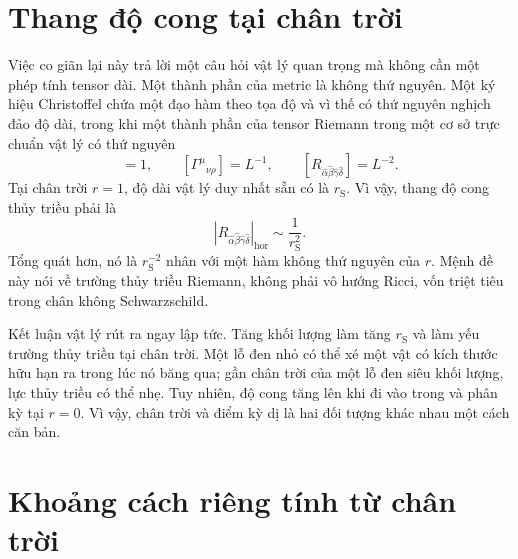 \begin{classroomqa}
\end{classroomqa}

\section{Thang độ cong tại chân trời}

Việc co giãn lại này trả lời một câu hỏi vật lý quan trọng mà không cần một phép tính tensor dài. Một thành phần của metric là không thứ nguyên. Một ký hiệu Christoffel chứa một đạo hàm theo tọa độ và vì thế có thứ nguyên nghịch đảo độ dài, trong khi một thành phần của tensor Riemann trong một cơ sở trực chuẩn vật lý có thứ nguyên
\begin{equation}
[g_{\mu\nu}]=1,
\qquad
[\Gamma^\mu{}_{\nu\rho}]=L^{-1},
\qquad
[R_{\hat\alpha\hat\beta\hat\gamma\hat\delta}]
=L^{-2}.
\label{eq:l7-curvature-dimensions}
\end{equation}
Tại chân trời \(r=1\), độ dài vật lý duy nhất sẵn có là
\(r_{\mathrm S}\). Vì vậy, thang độ cong thủy triều phải là
\begin{equation}
\left|R_{\hat\alpha\hat\beta\hat\gamma\hat\delta}\right|_{\mathrm{hor}}
\sim \frac{1}{r_{\mathrm S}^2}.
\label{eq:l7-horizon-curvature}
\end{equation}
Tổng quát hơn, nó là \(r_{\mathrm S}^{-2}\) nhân với một hàm không thứ nguyên của
\(r\). Mệnh đề này nói về trường thủy triều Riemann, không phải vô hướng Ricci, vốn triệt tiêu trong chân không Schwarzschild.

Kết luận vật lý rút ra ngay lập tức. Tăng khối lượng làm tăng
\(r_{\mathrm S}\) và làm yếu trường thủy triều tại chân trời. Một lỗ đen nhỏ có thể xé một vật có kích thước hữu hạn ra trong lúc nó băng qua; gần chân trời của một lỗ đen siêu khối lượng, lực thủy triều có thể nhẹ. Tuy nhiên, độ cong tăng lên khi đi vào trong và phân kỳ tại \(r=0\). Vì vậy, chân trời và điểm kỳ dị là hai đối tượng khác nhau một cách căn bản.

\section{Khoảng cách riêng tính từ chân trời}

